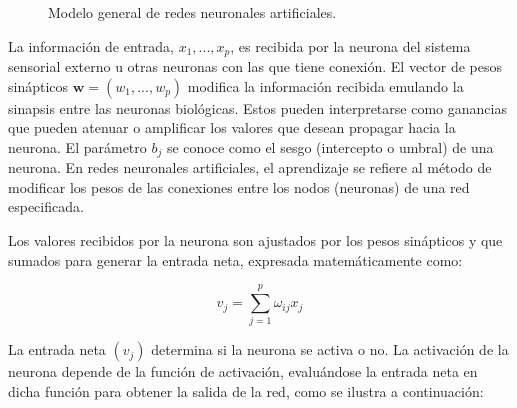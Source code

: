\documentclass[
  us-letterpaper,
]{scrreprt}
\theoremstyle{plain}
\theoremstyle{definition}
\theoremstyle{plain}
\theoremstyle{definition}
\theoremstyle{remark}
\begin{document}
\begin{figure}


\caption{\label{fig-modelogen}Modelo general de redes neuronales
artificiales.}

\end{figure}%

La información de entrada, \(x_1, ..., x_p\), es recibida por la neurona
del sistema sensorial externo u otras neuronas con las que tiene
conexión. El vector de pesos sinápticos \(\mathbf{w} = (w_1, ..., w_p)\)
modifica la información recibida emulando la sinapsis entre las neuronas
biológicas. Estos pueden interpretarse como ganancias que pueden atenuar
o amplificar los valores que desean propagar hacia la neurona. El
parámetro \(b_j\) se conoce como el sesgo (intercepto o umbral) de una
neurona. En redes neuronales artificiales, el aprendizaje se refiere al
método de modificar los pesos de las conexiones entre los nodos
(neuronas) de una red especificada.

Los valores recibidos por la neurona son ajustados por los pesos
sinápticos y que sumados para generar la entrada neta, expresada
matemáticamente como:

\[v_j=\sum_{j=1}^p \omega_{ij}x_j\]

La entrada neta \((v_j)\) determina si la neurona se activa o no. La
activación de la neurona depende de la función de activación,
evaluándose la entrada neta en dicha función para obtener la salida de
la red, como se ilustra a continuación:
\end{document}
